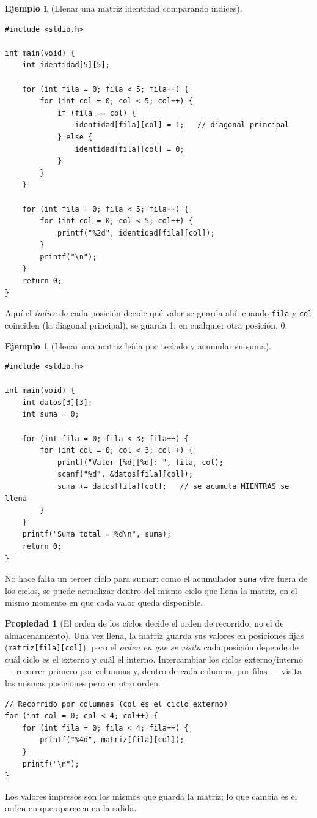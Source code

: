 \documentclass[11pt,letterpaper]{article}
\theoremstyle{definition}
\newtheorem{ejemplo}[definicion]{Ejemplo}
\newtheorem{propiedad}[definicion]{Propiedad}
\begin{document}
\begin{ejemplo}[Llenar una matriz identidad comparando índices]
\begin{lstlisting}
#include <stdio.h>

int main(void) {
    int identidad[5][5];

    for (int fila = 0; fila < 5; fila++) {
        for (int col = 0; col < 5; col++) {
            if (fila == col) {
                identidad[fila][col] = 1;   // diagonal principal
            } else {
                identidad[fila][col] = 0;
            }
        }
    }

    for (int fila = 0; fila < 5; fila++) {
        for (int col = 0; col < 5; col++) {
            printf("%2d", identidad[fila][col]);
        }
        printf("\n");
    }
    return 0;
}
\end{lstlisting}
Aquí el \emph{índice} de cada posición decide qué valor se guarda ahí: cuando \texttt{fila} y
\texttt{col} coinciden (la diagonal principal), se guarda 1; en cualquier otra posición, 0.
\end{ejemplo}

\begin{ejemplo}[Llenar una matriz leída por teclado y acumular su suma]
\begin{lstlisting}
#include <stdio.h>

int main(void) {
    int datos[3][3];
    int suma = 0;

    for (int fila = 0; fila < 3; fila++) {
        for (int col = 0; col < 3; col++) {
            printf("Valor [%d][%d]: ", fila, col);
            scanf("%d", &datos[fila][col]);
            suma += datos[fila][col];   // se acumula MIENTRAS se llena
        }
    }
    printf("Suma total = %d\n", suma);
    return 0;
}
\end{lstlisting}
No hace falta un tercer ciclo para sumar: como el acumulador \texttt{suma} vive fuera de los
ciclos, se puede actualizar dentro del mismo ciclo que llena la matriz, en el mismo momento en que
cada valor queda disponible.
\end{ejemplo}

\begin{propiedad}[El orden de los ciclos decide el orden de recorrido, no el de almacenamiento]
Una vez llena, la matriz guarda sus valores en posiciones fijas (\texttt{matriz[fila][col]}); pero
el \emph{orden en que se visita} cada posición depende de cuál ciclo es el externo y cuál el
interno. Intercambiar los ciclos externo/interno --- recorrer primero por columnas y, dentro de
cada columna, por filas --- visita las mismas posiciones pero en otro orden:
\begin{lstlisting}
// Recorrido por columnas (col es el ciclo externo)
for (int col = 0; col < 4; col++) {
    for (int fila = 0; fila < 4; fila++) {
        printf("%4d", matriz[fila][col]);
    }
    printf("\n");
}
\end{lstlisting}
Los valores impresos son los mismos que guarda la matriz; lo que cambia es el orden en que
aparecen en la salida.
\end{propiedad}
\end{document}
